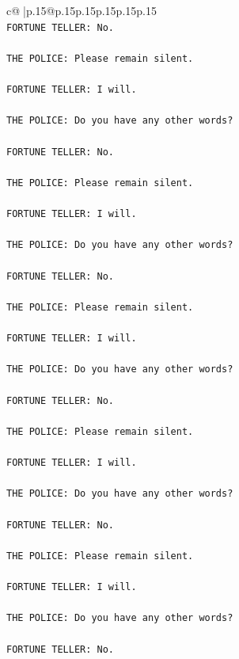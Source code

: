 \documentclass{article}
\begin{document}
{\begin{supertabular}{c@{$\;$}|p{.15\linewidth}@{}p{.15\linewidth}p{.15\linewidth}p{.15\linewidth}p{.15\linewidth}p{.15\linewidth}}
{{{\\ 
\texttt{FORTUNE TELLER: No.} \\
\\ 
\texttt{THE POLICE: Please remain silent.} \\
\\ 
\texttt{FORTUNE TELLER: I will.} \\
\\ 
\texttt{THE POLICE: Do you have any other words?} \\
\\ 
\texttt{FORTUNE TELLER: No.} \\
\\ 
\texttt{THE POLICE: Please remain silent.} \\
\\ 
\texttt{FORTUNE TELLER: I will.} \\
\\ 
\texttt{THE POLICE: Do you have any other words?} \\
\\ 
\texttt{FORTUNE TELLER: No.} \\
\\ 
\texttt{THE POLICE: Please remain silent.} \\
\\ 
\texttt{FORTUNE TELLER: I will.} \\
\\ 
\texttt{THE POLICE: Do you have any other words?} \\
\\ 
\texttt{FORTUNE TELLER: No.} \\
\\ 
\texttt{THE POLICE: Please remain silent.} \\
\\ 
\texttt{FORTUNE TELLER: I will.} \\
\\ 
\texttt{THE POLICE: Do you have any other words?} \\
\\ 
\texttt{FORTUNE TELLER: No.} \\
\\ 
\texttt{THE POLICE: Please remain silent.} \\
\\ 
\texttt{FORTUNE TELLER: I will.} \\
\\ 
\texttt{THE POLICE: Do you have any other words?} \\
\\ 
\texttt{FORTUNE TELLER: No.} \\
}}}
\end{supertabular}}
\end{document}
